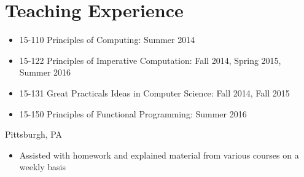 \documentclass[11pt,letterpaper,sans,final]{moderncv}
\begin{document}
\section{Teaching Experience}
    {
      \begin{itemize}
        \item 15-110 Principles of Computing: Summer 2014
        \item 15-122 Principles of Imperative Computation: Fall 2014,
          Spring 2015, Summer 2016
        \item 15-131 Great Practicals Ideas in Computer Science: Fall 2014, Fall 2015
        \item 15-150 Principles of Functional Programming: Summer 2016
      \end{itemize}
    }
    {Pittsburgh, PA}{}
    {
      \begin{itemize}
        \item Assisted with homework and explained material from various courses
          on a weekly basis
      \end{itemize}
    }
\end{document}
